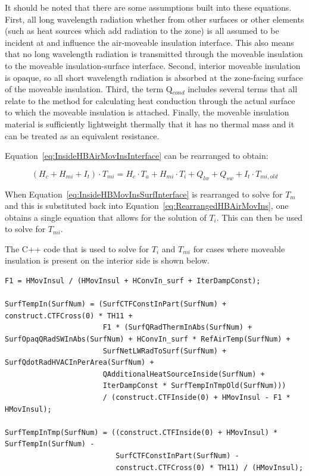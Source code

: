 It should be noted that there are some assumptions built into these equations. First, all long wavelength radiation whether from other surfaces or other elements (such as heat sources which add radiation to the zone) is all assumed to be incident at and influence the air-moveable insulation interface. This also means that no long wavelength radiation is transmitted through the moveable insulation to the moveable insulation-surface interface. Second, interior moveable insulation is opaque, so all short wavelength radiation is absorbed at the zone-facing surface of the moveable insulation. Third, the term Q\(_{cond}\) includes several terms that all relate to the method for calculating heat conduction through the actual surface to which the moveable insulation is attached. Finally, the moveable insulation material is sufficiently lightweight thermally that it has no thermal mass and it can be treated as an equivalent resistance.

Equation~\ref{eq:InsideHBAirMovInsInterface} can be rearranged to obtain:

\begin{equation}
\left( H_c + H_{mi} + I_t \right) \cdot T_{mi} = H_c \cdot T_a + H_{mi} \cdot T_i + Q_{lw} + Q_{sw} + I_t \cdot T_{mi,old}
\label{eq:RearrangedHBAirMovIns}
\end{equation}

When Equation~\ref{eq:InsideHBMovInsSurfInterface} is rearranged to solve for \(T_m\) and this is substituted back into Equation~\ref{eq:RearrangedHBAirMovIns}, one obtains a single equation that allows for the solution of \(T_i\).  This can then be used to solve for \(T_{mi}\).

The C++ code that is used to solve for \(T_i\) and \(T_{mi}\) for cases where moveable insulation is present on the interior side is shown below.

\begin{lstlisting}
F1 = HMovInsul / (HMovInsul + HConvIn_surf + IterDampConst);

SurfTempIn(SurfNum) = (SurfCTFConstInPart(SurfNum) + construct.CTFCross(0) * TH11 +
                       F1 * (SurfQRadThermInAbs(SurfNum) + SurfOpaqQRadSWInAbs(SurfNum) + HConvIn_surf * RefAirTemp(SurfNum) +
                       SurfNetLWRadToSurf(SurfNum) + SurfQdotRadHVACInPerArea(SurfNum) +
                       QAdditionalHeatSourceInside(SurfNum) +
                       IterDampConst * SurfTempInTmpOld(SurfNum)))
                       / (construct.CTFInside(0) + HMovInsul - F1 * HMovInsul);

SurfTempInTmp(SurfNum) = ((construct.CTFInside(0) + HMovInsul) * SurfTempIn(SurfNum) -
                          SurfCTFConstInPart(SurfNum) -
                          construct.CTFCross(0) * TH11) / (HMovInsul);
\end{lstlisting}

